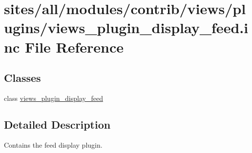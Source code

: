 \hypertarget{views__plugin__display__feed_8inc}{
\section{sites/all/modules/contrib/views/plugins/views\_\-plugin\_\-display\_\-feed.inc File Reference}
\label{views__plugin__display__feed_8inc}
}
\subsection*{Classes}
\begin{CompactItemize}
\item 
class \hyperlink{classviews__plugin__display__feed}{views\_\-plugin\_\-display\_\-feed}
\end{CompactItemize}


\subsection{Detailed Description}
Contains the feed display plugin. 
